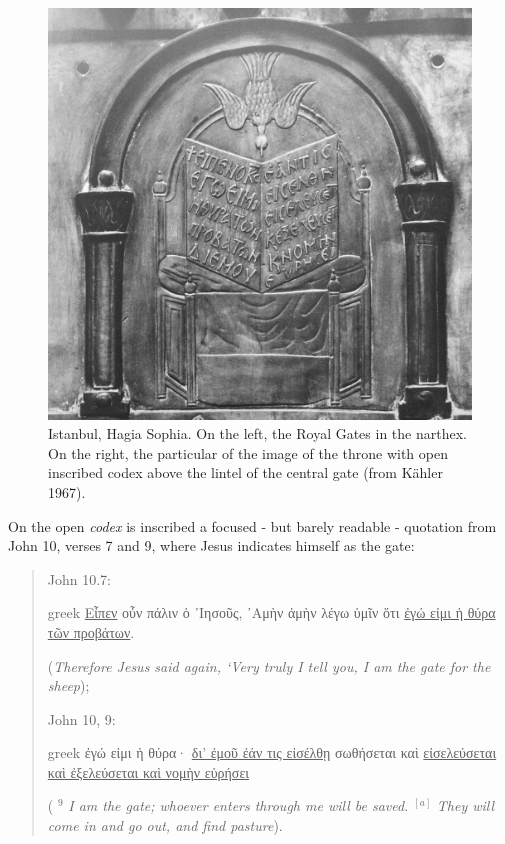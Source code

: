 \documentclass[amsthm,ebook]{saparticle}
\begin{document}
\begin{figure}[!hbp]
\begin{minipage}[c]{0.57\textwidth}
 \includegraphics[width=\columnwidth]{FelleVisualFeaturesofinscriptionsEAGLE2016FullPaper-img013.jpg}
\end{minipage}
\caption{Istanbul, Hagia Sophia. On the left, the Royal Gates in the narthex. On the right, the particular of the image
of the throne with open inscribed codex above the lintel of the central gate (from Kähler 1967).}
\label{fig:9}
\end{figure}


\newpage
On the open \emph{codex} is inscribed a focused - but barely readable - quotation from John 10, verses 7 and 9, where Jesus
indicates himself as the gate: 




\begin{quotation}
John 10.7: \begin{otherlanguage*}{greek}
\underline{Εἶπεν} οὖν πάλιν ὁ ᾿Ιησοῦς, ᾿Αμὴν ἀμὴν λέγω ὑμῖν ὅτι \underline{ἐγώ εἰμι ἡ θύρα τῶν προβάτων}.
\end{otherlanguage*} (\emph{Therefore Jesus said again, ‘Very truly I tell you, I am the gate for the sheep}); 

John 10, 9: \begin{otherlanguage*}{greek}
ἐγώ εἰμι ἡ θύρα· \underline{δι' ἐμοῦ ἐάν τις εἰσέλθῃ} σωθήσεται καὶ \underline{εἰσελεύσεται καὶ ἐξελεύσεται καὶ νομὴν εὑρήσει}
\end{otherlanguage*}  ( $^\textit{9}$ \emph{I am the gate;
whoever enters through me will be saved.} $^{[a]}$ \emph{They will come in and go out, and find pasture}).

\end{quotation}
\end{document}
